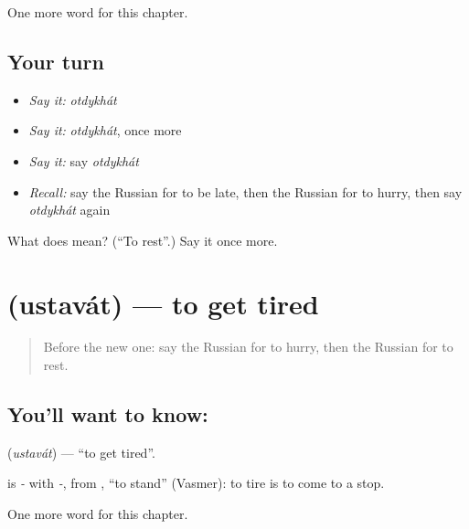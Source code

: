 \begin{grammarlens}[title={What you've built}]
One more word for this chapter.
\end{grammarlens}

\subsection*{Your turn}
\begin{itemize}
\raggedright
  \item \emph{Say it:} \emph{otdykhát}
  \item \emph{Say it:} \emph{otdykhát}, once more
  \item \emph{Say it:} say \emph{otdykhát}
  \item \emph{Recall:} say the Russian for to be late, then the Russian for to hurry, then say \emph{otdykhát} again
\end{itemize}

\begin{tcolorbox}[breakable,colback=teal!4,colframe=teal!35!black,title={Before you move on}]
What does  mean? (\textquotedblleft{}To rest\textquotedblright{}.) Say it once more.
\end{tcolorbox}
\section[\texorpdfstring{\ru{уставать} (ustavát)}{уставать (ustavát)}]{ (ustavát) — to get tired}

\label{lesson:RU-C176-ustavat}



\begin{quote}
Before the new one: say the Russian for to hurry, then the Russian for to rest.
\end{quote}

\subsection*{You'll want to know: }
\textbf{} (\emph{ustavát}) — \textquotedblleft{}to get tired\textquotedblright{}.

\begin{cousinweb}
\textbf{} is \emph{-} with \emph{-}, from \emph{}, \textquotedblleft{}to stand\textquotedblright{} (Vasmer): to tire is to come to a stop.
\end{cousinweb}

\begin{grammarlens}[title={What you've built}]
One more word for this chapter.
\end{grammarlens}

